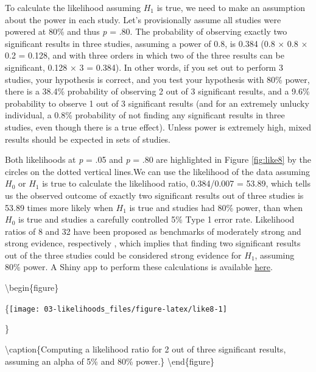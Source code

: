\documentclass[
  oneside]{book}
\begin{document}
To calculate the likelihood assuming \(H_1\) is true, we need to make an assumption about the power in each study. Let's provisionally assume all studies were powered at 80\% and thus \emph{p} = .80. The probability of observing exactly two significant results in three studies, assuming a power of 0.8, is 0.384 (0.8 × 0.8 × 0.2 = 0.128, and with three orders in which two of the three results can be significant, 0.128 × 3 = 0.384). In other words, if you set out to perform 3 studies, your hypothesis is correct, and you test your hypothesis with 80\% power, there is a 38.4\% probability of observing 2 out of 3 significant results, and a 9.6\% probability to observe 1 out of 3 significant results (and for an extremely unlucky individual, a 0.8\% probability of not finding any significant results in three studies, even though there is a true effect). Unless power is extremely high, mixed results should be expected in sets of studies.

Both likelihoods at \emph{p} = .05 and \emph{p} = .80 are highlighted in Figure \ref{fig:like8} by the circles on the dotted vertical lines.We can use the likelihood of the data assuming \(H_0\) or \(H_1\) is true to calculate the likelihood ratio, 0.384/0.007 = 53.89, which tells us the observed outcome of exactly two significant results out of three studies is 53.89 times more likely when \(H_1\) is true and studies had 80\% power, than when \(H_0\) is true and studies a carefully controlled 5\% Type 1 error rate. Likelihood ratios of 8 and 32 have been proposed as benchmarks of moderately strong and strong evidence, respectively \citep{royall_statistical_1997}, which implies that finding two significant results out of the three studies could be considered strong evidence for \(H_1\), assuming 80\% power. A Shiny app to perform these calculations is available \href{https://shiny.ieis.tue.nl/mixed_results_likelihood/}{here}.

\textbackslash begin\{figure\}

\{\centering \texttt{[image: 03-likelihoods\_files/figure-latex/like8-1]}

\}

\textbackslash caption\{Computing a likelihood ratio for 2 out of three significant results, assuming an alpha of 5\% and 80\% power.\}\label{fig:like8}
\textbackslash end\{figure\}
\end{document}

